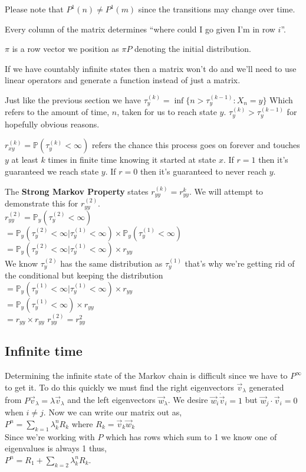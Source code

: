 \documentclass[10pt,landscape,a4paper]{article}
\begin{document}
\begin{multicols*}{4}
Please note that $P^1(n) \neq P^1(m)$ since the transitions may change over
time.

Every column of the matrix determines ``where could I go given I'm in row $i$''.

$\pi$ is a row vector we position as $\pi P$ denoting the initial
distribution.

If we have countably infinite states then a matrix won't do and we'll need
to use linear operators and generate a function instead of just a matrix.

Just like the previous section we have
$\tau_y^{(k)} = \inf\{n > \tau_y^{(k-1)} : X_n = y\}$
Which refers to the amount of time, $n$, taken for us to reach state $y$.
$\tau_y^{(k)} > \tau_y^{(k-1)}$ for hopefully obvious reasons.

$r_{xy}^{(k)} = \mathbb{P}(\tau_y^{(k)} < \infty)$ refers the chance this
process goes on forever and touches $y$ at least $k$ times in finite time
knowing it started at state $x$. If $r=1$ then it's guaranteed we reach
state $y$. If $r=0$ then it's guaranteed to never reach $y$.

The \textbf{Strong Markov Property} states $r_{yy}^{(k)} = r_{yy}^k$. We
will attempt to demonstrate this for $r_{yy}^{(2)}$. \\
$r_{yy}^{(2)} = \mathbb{P}_y(\tau_y^{(2)} < \infty)$ \\
$= \mathbb{P}_y(\tau_y^{(2)} < \infty | \tau_y^{(1)} < \infty)
\times \mathbb{P}_y(\tau_y^{(1)} < \infty)$ \\
$= \mathbb{P}_y(\tau_y^{(2)} < \infty | \tau_y^{(1)} < \infty) \times r_{yy}$ \\
We know $\tau_y^{(2)}$ has the same distribution as $\tau_y^{(1)}$ 
that's why we're getting rid of the conditional but keeping the
distribution \\
$= \mathbb{P}_y(\tau_y^{(1)} < \infty | \tau_y^{(1)} < \infty) \times r_{yy}$ \\
$= \mathbb{P}_y(\tau_y^{(1)} < \infty) \times r_{yy}$ \\
$= r_{yy} \times r_{yy}$
$r_{yy}^{(2)} = r_{yy}^2$ 
\subsection{Infinite time}
Determining the infinite state of the Markov chain is difficult since we
have to $P^\infty$ to get it.
To do this quickly we must find the right eigenvectors $\vec{v}_\lambda$
generated from $P \vec{v}_\lambda = \lambda \vec{v}_\lambda$
and the left eigenvectors
$\vec{w}_\lambda$. We desire $\vec{w}_i \dot \vec{v}_i = 1$ but
$\vec{w}_j \cdot \vec{v}_i = 0$ when $i \neq j$.
Now we can write our matrix out as, \\
$P^n = \sum_{k=1} \lambda_k^n R_k$ where $R_k = \vec{v}_k \vec{w}_k$ \\
Since we're working with $P$ which has rows which sum to 1 we know one of
eigenvalues is always 1 thus, \\
$P^n = R_1 + \sum_{k=2} \lambda_k^n R_k$.


\end{multicols*}
\end{document}
